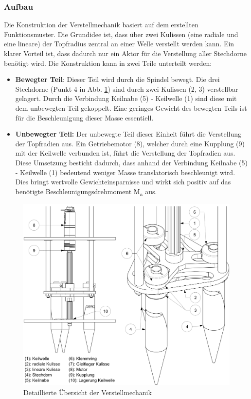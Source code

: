 \subsubsection{Aufbau}
Die Konstruktion der Verstellmechanik basiert auf dem erstellten Funktionsmuster. Die Grundidee ist, dass über zwei Kulissen (eine radiale und eine lineare) der Topfradius zentral an einer Welle verstellt werden kann. Ein klarer Vorteil ist, dass dadurch nur ein Aktor für die Verstellung aller Stechdorne benötigt wird. Die Konstruktion kann in zwei Teile unterteilt werden:
\begin{itemize}
	\item \textbf{Bewegter Teil}: Dieser Teil wird durch die Spindel bewegt. Die drei Stechdorne (Punkt 4 in Abb. \ref{fig:details_vm}) sind durch zwei Kulissen (2, 3) verstellbar gelagert. Durch die Verbindung Keilnabe (5) - Keilwelle (1) sind diese mit dem unbewegten Teil gekoppelt. Eine geringes Gewicht des bewegten Teils ist für die Beschleunigung dieser Masse essentiell.
	
	\item \textbf{Unbewegter Teil:} Der unbewegte Teil dieser Einheit führt die Verstellung der Topfradien aus. Ein Getriebemotor (8), welcher durch eine Kupplung (9) mit der Keilwelle verbunden ist, führt die Verstellung der Topfradien aus. Diese Umsetzung besticht dadurch, dass anhand der Verbindung Keilnabe (5) - Keilwelle (1) bedeutend weniger Masse translatorisch beschleunigt wird. Dies bringt wertvolle Gewichteinsparnisse und wirkt sich positiv auf das benötigte Beschleunigungsdrehmoment M\textsubscript{a} aus.
\end{itemize}
	\begin{figure}[H]
	\includegraphics[scale=0.6]{Illustrationen/6-Umsetzung/details_vm.jpg}
	\caption{Detaillierte Übersicht der Verstellmechanik}
	\label{fig:details_vm}
	\end{figure}
